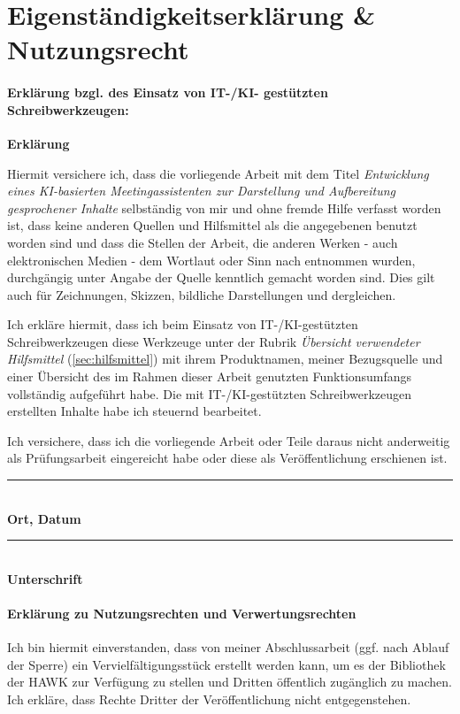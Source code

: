 \chapter{Eigenständigkeitserklärung \& Nutzungsrecht}
\subsubsection{Erklärung bzgl. des Einsatz von IT-/KI- gestützten Schreibwerkzeugen:}

\textbf{Erklärung}

Hiermit versichere ich, dass die vorliegende Arbeit mit dem Titel \textit{Entwicklung eines KI-basierten Meetingassistenten zur Darstellung und Aufbereitung gesprochener Inhalte} selbständig von mir und ohne fremde Hilfe verfasst worden ist, dass keine anderen Quellen und Hilfsmittel als die angegebenen benutzt worden sind und dass die Stellen der Arbeit, die anderen Werken - auch elektronischen Medien - dem Wortlaut oder Sinn nach entnommen wurden, durchgängig unter Angabe der Quelle kenntlich gemacht worden sind. Dies gilt auch für Zeichnungen, Skizzen, bildliche Darstellungen und dergleichen.

Ich erkläre hiermit, dass ich beim Einsatz von IT-/KI-gestützten Schreibwerkzeugen diese Werkzeuge unter der Rubrik \textit{Übersicht verwendeter Hilfsmittel} (\ref{sec:hilfsmittel}) mit ihrem Produktnamen, meiner Bezugsquelle und einer Übersicht des im Rahmen dieser Arbeit genutzten Funktionsumfangs vollständig aufgeführt habe. Die mit IT-/KI-gestützten Schreibwerkzeugen erstellten Inhalte habe ich steuernd bearbeitet.

Ich versichere, dass ich die vorliegende Arbeit oder Teile daraus nicht anderweitig als Prüfungsarbeit eingereicht habe oder diese als Veröffentlichung erschienen ist.

\vspace{1cm}

\noindent
\begin{minipage}[t]{0.45\textwidth}
    \rule{5cm}{0.4pt} \\ 
    \textbf{Ort, Datum}
\end{minipage}%
\hfill
\begin{minipage}[t]{0.45\textwidth}
    \rule{5cm}{0.4pt} \\ 
    \textbf{Unterschrift}
\end{minipage}

\subsubsection{Erklärung zu Nutzungsrechten und Verwertungsrechten}
Ich bin hiermit einverstanden, dass von meiner Abschlussarbeit (ggf. nach Ablauf der Sperre) ein
Vervielfältigungsstück erstellt werden kann, um es der Bibliothek der HAWK zur Verfügung zu
stellen und Dritten öffentlich zugänglich zu machen.
Ich erkläre, dass Rechte Dritter der Veröffentlichung nicht entgegenstehen.

